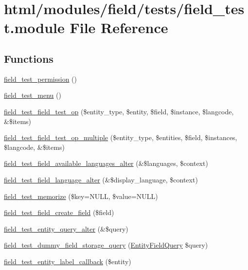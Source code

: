 \hypertarget{field__test_8module}{
\section{html/modules/field/tests/field\_\-test.module File Reference}
\label{field__test_8module}
}
\subsection*{Functions}
\begin{DoxyCompactItemize}
\item 
\hyperlink{field__test_8module_a503ace608465fba9f475e888bdad3877}{field\_\-test\_\-permission} ()
\item 
\hyperlink{field__test_8module_aa880119cd376662b76b8106183cbc6a3}{field\_\-test\_\-menu} ()
\item 
\hyperlink{field__test_8module_acf091a4178bd84d202a69e32e2b46a12}{field\_\-test\_\-field\_\-test\_\-op} (\$entity\_\-type, \$entity, \$field, \$instance, \$langcode, \&\$items)
\item 
\hyperlink{field__test_8module_a9bd2f4a0811ce446841803c46aa58517}{field\_\-test\_\-field\_\-test\_\-op\_\-multiple} (\$entity\_\-type, \$entities, \$field, \$instances, \$langcode, \&\$items)
\item 
\hyperlink{field__test_8module_a0a6f85b074751f24280d72b415dab142}{field\_\-test\_\-field\_\-available\_\-languages\_\-alter} (\&\$languages, \$context)
\item 
\hyperlink{field__test_8module_a79a1254b2e78af563bb7d87e5f36fdd9}{field\_\-test\_\-field\_\-language\_\-alter} (\&\$display\_\-language, \$context)
\item 
\hyperlink{field__test_8module_ad47dcd73d5f7aeb1f49a0bb0e302ef93}{field\_\-test\_\-memorize} (\$key=NULL, \$value=NULL)
\item 
\hyperlink{field__test_8module_a7932459be94e84648d5dbcd0f5607879}{field\_\-test\_\-field\_\-create\_\-field} (\$field)
\item 
\hyperlink{field__test_8module_a2d15737af11f252dd9227af814f0f2b1}{field\_\-test\_\-entity\_\-query\_\-alter} (\&\$query)
\item 
\hyperlink{field__test_8module_a775d055844d9136ac44a68c9c254ef05}{field\_\-test\_\-dummy\_\-field\_\-storage\_\-query} (\hyperlink{classEntityFieldQuery}{EntityFieldQuery} \$query)
\item 
\hyperlink{field__test_8module_a0a7edfbc235c467287808743d0970c06}{field\_\-test\_\-entity\_\-label\_\-callback} (\$entity)

\end{DoxyCompactItemize}
